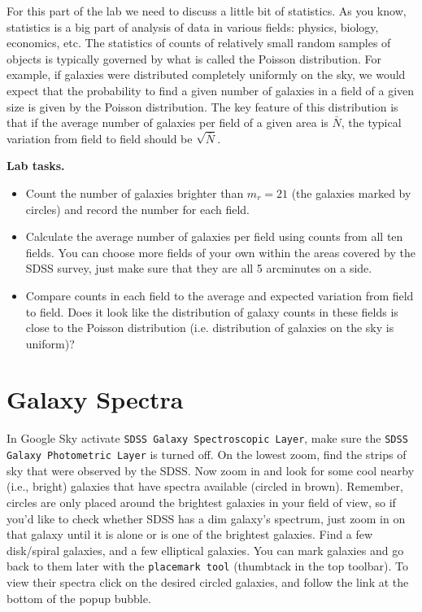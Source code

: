 \documentclass[12pt]{article}
\begin{document}
For this part of the lab we need to discuss a little bit of statistics. 
As you know, statistics is a big part of analysis of data in various 
fields: physics, biology, economics, etc. The statistics of counts 
of relatively small random samples of objects is typically governed 
by what is called the Poisson distribution. For example, if galaxies
were distributed completely uniformly on the sky, we would expect that 
the probability to find a given number of galaxies in a field of a given
size is given by the Poisson distribution. The key feature of this 
distribution is that if the average number of galaxies per field of 
a given area is $\bar{N}$, the typical variation from field to field
should be $\sqrt{\bar{N}}$. 

{\bf Lab tasks.}
{\it 
\begin{itemize}
\item Count the number of galaxies brighter than $m_r=21$ (the galaxies
marked by circles) and record the number for each field. 
\item Calculate the average number of galaxies per field using counts from all 
ten fields. You can choose more fields of your own within the areas
covered by the SDSS survey, just make sure that they
are all 5 arcminutes on a side. 
\item Compare counts in each field to the average and expected variation from field
to field. Does it look like the distribution of galaxy counts in these fields
is close to the Poisson distribution (i.e. distribution of galaxies on the sky
is uniform)?
\end{itemize} 
}

\section*{Galaxy Spectra}

In Google Sky activate \texttt{SDSS Galaxy Spectroscopic Layer},
make sure the \texttt{SDSS Galaxy Photometric Layer} is turned off. On the lowest zoom,
find the strips of sky that were observed by the SDSS. Now zoom in and
look for some cool nearby (i.e., bright) galaxies that have spectra available
(circled in brown). Remember, circles are only placed around the
brightest galaxies in your field of view, so if you'd like to check
whether SDSS has a dim galaxy's spectrum, just zoom in on that galaxy
until it is alone or is one of the brightest galaxies.  Find a few
disk/spiral galaxies, and a few elliptical galaxies.  You can
mark galaxies and go back to them later with the \texttt{placemark
tool} (thumbtack in the top toolbar). To view their spectra click on
the desired circled galaxies, and follow the link at the bottom of the
popup bubble.
\end{document}
